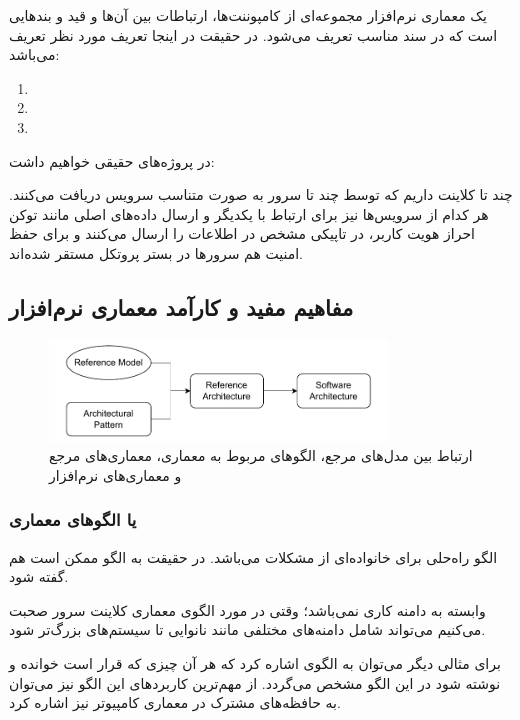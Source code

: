 یک معماری نرم‌افزار مجموعه‌ای از کامپوننت‌ها، ارتباطات بین آن‌ها و قید و
بند‌هایی است که در سند مناسب تعریف می‌شود. در حقیقت در اینجا تعریف مورد نظر
تعریف  می‌باشد:

\begin{enumerate}
    \item {}
    \item {}
    \item {}
\end{enumerate}

در پروژه‌های حقیقی خواهیم داشت:

چند تا کلاینت داریم که توسط چند تا سرور به صورت متناسب سرویس دریافت می‌کنند. هر
کدام از سرویس‌ها نیز برای ارتباط با یکدیگر و ارسال داده‌های اصلی مانند توکن
احراز هویت کاربر، در تاپیکی مشخص در  اطلاعات را ارسال می‌کنند و برای
حفظ امنیت هم سرور‌ها در بستر پروتکل  مستقر شده‌اند.

\subsection{مفاهیم مفید و کارآمد معماری نرم‌افزار}

\begin{figure}[H]
    \centering
    \includegraphics[width=0.8\textwidth]{images/box_and_arrow_sa.drawio.pdf}
    \caption{ارتباط بین مدل‌های مرجع، الگو‌های مربوط به معماری، معماری‌های مرجع
    و معماری‌های نرم‌افزار}
    \label{fig:saStages}
\end{figure}

\subsubsection{ یا الگو‌های معماری}

الگو راه‌حلی برای خانواده‌ای از مشکلات می‌باشد. در حقیقت به الگو ممکن است
 هم گفته شود.

وابسته به دامنه کاری نمی‌باشد؛ وقتی در مورد الگوی معماری کلاینت سرور صحبت
می‌کنیم می‌تواند شامل دامنه‌های مختلفی مانند نانوایی تا سیستم‌های بزرگ‌تر شود.

برای مثالی دیگر می‌توان به الگوی  اشاره کرد که هر آن چیزی که
قرار است خوانده و نوشته شود در این الگو مشخص می‌گردد. از مهم‌ترین کاربرد‌های این
الگو نیز می‌توان به حافظه‌های مشترک در معماری کامپیوتر نیز اشاره کرد.

